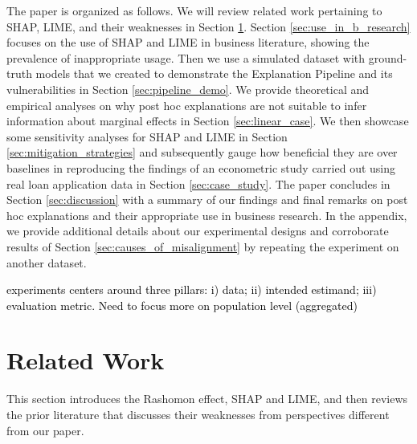 \documentclass[mnsc,blindrev]{informs3}
\newcommand{\tw}[1]{\textcolor{black}{Tong: #1}}
\begin{document}
    The paper is organized as follows. We will review related work pertaining to SHAP, LIME, and their weaknesses in Section \ref{sec:related_work}. Section \ref{sec:use_in_b_research} focuses on the use of SHAP and LIME in business literature, showing the prevalence of inappropriate usage. Then we use a simulated dataset with ground-truth models that we created to demonstrate the Explanation Pipeline and its vulnerabilities in Section \ref{sec:pipeline_demo}.  We provide theoretical and empirical analyses on why post hoc explanations are not suitable to infer information about marginal effects in Section \ref{sec:linear_case}. 
    We then showcase some sensitivity analyses for SHAP and LIME in Section \ref{sec:mitigation_strategies} and subsequently gauge how beneficial they are over baselines in reproducing the findings of an econometric study carried out using real loan application data in Section \ref{sec:case_study}. The paper concludes in Section \ref{sec:discussion} with a summary of our findings and final remarks on post hoc explanations and their appropriate use in business research. In the appendix, we provide additional details about our experimental designs and  corroborate results of Section \ref{sec:causes_of_misalignment} by repeating the experiment on another dataset.%

    \textcolor{black}{experiments centers around three pillars: i) data; ii) intended estimand; iii) evaluation metric. Need to focus more on population level (aggregated)}
\section{Related Work}
    \label{sec:related_work}
    This section introduces the Rashomon effect, SHAP and LIME, and then reviews the prior literature that discusses their weaknesses from perspectives different from our paper. %

    
\end{document}
